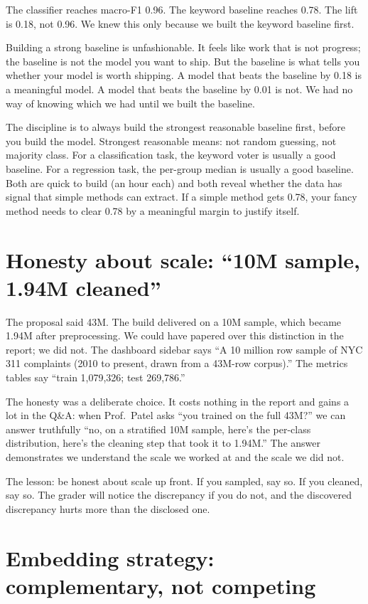 \documentclass[11pt,letterpaper]{book}
\begin{document}
The classifier reaches macro-F1 0.96. The keyword baseline reaches 0.78. The lift is 0.18, not 0.96. We knew this only because we built the keyword baseline first.

Building a strong baseline is unfashionable. It feels like work that is not progress; the baseline is not the model you want to ship. But the baseline is what tells you whether your model is worth shipping. A model that beats the baseline by 0.18 is a meaningful model. A model that beats the baseline by 0.01 is not. We had no way of knowing which we had until we built the baseline.

The discipline is to always build the strongest reasonable baseline first, before you build the model. Strongest reasonable means: not random guessing, not majority class. For a classification task, the keyword voter is usually a good baseline. For a regression task, the per-group median is usually a good baseline. Both are quick to build (an hour each) and both reveal whether the data has signal that simple methods can extract. If a simple method gets 0.78, your fancy method needs to clear 0.78 by a meaningful margin to justify itself.

\section{Honesty about scale: ``10M sample, 1.94M cleaned''}

The proposal said 43M. The build delivered on a 10M sample, which became 1.94M after preprocessing. We could have papered over this distinction in the report; we did not. The dashboard sidebar says ``A 10 million row sample of NYC 311 complaints (2010 to present, drawn from a 43M-row corpus).'' The metrics tables say ``train 1,079,326; test 269,786.''

The honesty was a deliberate choice. It costs nothing in the report and gains a lot in the Q\&A: when Prof.\ Patel asks ``you trained on the full 43M?'' we can answer truthfully ``no, on a stratified 10M sample, here's the per-class distribution, here's the cleaning step that took it to 1.94M.'' The answer demonstrates we understand the scale we worked at and the scale we did not.

The lesson: be honest about scale up front. If you sampled, say so. If you cleaned, say so. The grader will notice the discrepancy if you do not, and the discovered discrepancy hurts more than the disclosed one.

\section{Embedding strategy: complementary, not competing}
\end{document}
